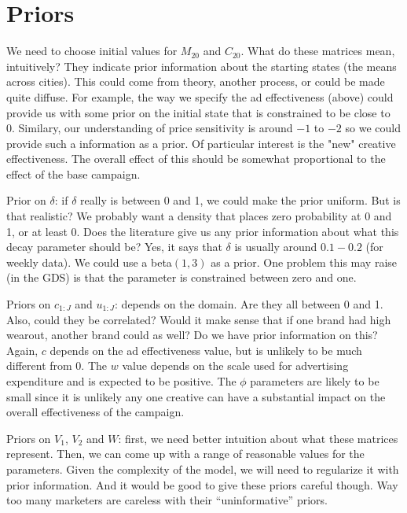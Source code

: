 \documentclass[letter,10pt]{article}
\begin{document}
\section*{Priors}

We need to choose initial values for $M_{20}$ and $C_{20}$.  What do
these matrices mean, intuitively?  They indicate prior information about the
starting states (the means across cities).  This could come from theory, another process, or could be made
quite diffuse.  For example, the way we specify the ad effectiveness (above) 
could provide us with some prior on the initial state that is constrained to be 
close to 0.  Similary, our understanding of price sensitivity is around $-1$ to $-2$
so we could provide such a information as a prior.   Of particular interest is
the "new" creative effectiveness.  The overall effect of this should be 
somewhat proportional to the effect of the base campaign.  

Prior on $\delta$:  if $\delta$ really is between 0 and 1, we could
make the prior uniform.  But is that realistic?  We probably want a
density that places zero probability at 0 and 1, or at least 0.  Does
the literature give us any prior information about what this decay
parameter should be?  Yes, it says that $\delta$ is usually around $0.1-0.2$ (for
weekly data).  We could use a beta$(1,3)$ as a prior.  One problem this
may raise (in the GDS) is that the parameter is constrained between zero and
one.  

Priors on $c_{1:J}$ and $u_{1:J}$:  depends on the domain.  Are they
all between 0 and 1.  Also, could they be correlated?  Would it make
sense that if one brand had high wearout, another brand could as well?
Do we have prior information on this?  Again, $c$ depends on the 
ad effectiveness value, but is unlikely to be much different from 0.  
The $w$ value depends on the scale used for advertising expenditure
and is expected to be positive.    The $\phi$ parameters are likely to be small
since it is unlikely any one creative can have a substantial impact on the 
overall effectiveness of the campaign.  

Priors on $V_1$, $V_2$ and $W$:  first, we need better intuition about
what these matrices represent.  Then, we can come up with a range of
reasonable values for the parameters.  Given the complexity of the
model, we will need to regularize it with prior information.  And it
would be good to give these priors careful though.  Way too many
marketers are careless with their ``uninformative'' priors.
\end{document}
